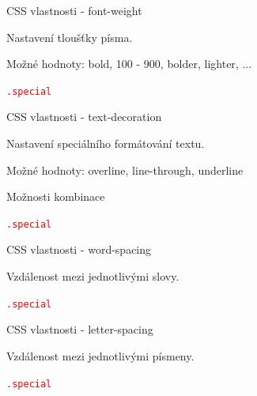 \documentclass[aspectratio=1610]{beamer}
\begin{document}
\begin{frame}{CSS vlastnosti - font-weight}
    \begin{cardTiny}
        Nastavení tloušťky písma.

        Možné hodnoty: bold, 100 - 900, bolder, lighter, ...

        \begin{alltt}
            \textcolor{red}{.special} \string{\\
                \textcolor{blue}{font-weight}: \textcolor{orange}{bold};\\
            \string}
        \end{alltt}
    \end{cardTiny}
\end{frame}

\begin{frame}{CSS vlastnosti - text-decoration}
    \begin{cardTiny}
        Nastavení speciálního formátování textu.

        Možné hodnoty: overline, line-through, underline

        Možnosti kombinace

        \begin{alltt}
            \textcolor{red}{.special} \string{\\
                \textcolor{blue}{text-decoration}: \textcolor{orange}{overline underline};\\
            \string}
        \end{alltt}
    \end{cardTiny}
\end{frame}

\begin{frame}{CSS vlastnosti - word-spacing}
    \begin{cardTiny}
        Vzdálenost mezi jednotlivými slovy. 

        \begin{alltt}
            \textcolor{red}{.special} \string{\\
                \textcolor{blue}{word-spacing}: \textcolor{orange}{10px};\\
            \string}
        \end{alltt}
    \end{cardTiny}
\end{frame}

\begin{frame}{CSS vlastnosti - letter-spacing}
    \begin{cardTiny}
        Vzdálenost mezi jednotlivými písmeny. 

        \begin{alltt}
            \textcolor{red}{.special} \string{\\
                \textcolor{blue}{letter-spacing}: \textcolor{orange}{-1px};\\
            \string}
        \end{alltt}
    \end{cardTiny}
\end{frame}
\end{document}
